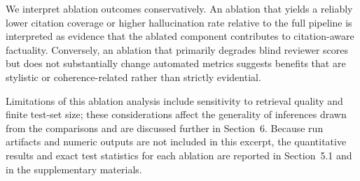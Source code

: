 We interpret ablation outcomes conservatively. An ablation that yields a reliably lower citation coverage or higher hallucination rate relative to the full pipeline is interpreted as evidence that the ablated component contributes to citation-aware factuality. Conversely, an ablation that primarily degrades blind reviewer scores but does not substantially change automated metrics suggests benefits that are stylistic or coherence-related rather than strictly evidential.

Limitations of this ablation analysis include sensitivity to retrieval quality and finite test-set size; these considerations affect the generality of inferences drawn from the comparisons and are discussed further in Section~6. Because run artifacts and numeric outputs are not included in this excerpt, the quantitative results and exact test statistics for each ablation are reported in Section~5.1 and in the supplementary materials.